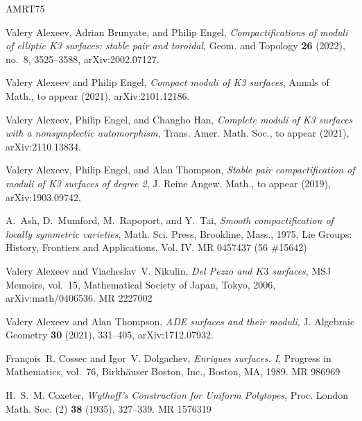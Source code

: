 \documentclass{amsart}
\begin{document}
\def\cprime{$'$}
\providecommand{\bysame}{\leavevmode\hbox to3em{\hrulefill}\thinspace}
\providecommand{\MR}{\relax\ifhmode\unskip\space\fi MR }
\providecommand{\MRhref}[2]{%
  \href{http://www.ams.org/mathscinet-getitem?mr=#1}{#2}
}
\providecommand{\href}[2]{#2}
\begin{thebibliography}{AMRT75}

Valery Alexeev, Adrian Brunyate, and Philip Engel, \emph{Compactifications of
  moduli of elliptic {K3} surfaces: stable pair and toroidal}, Geom. and
  Topology \textbf{26} (2022), no.~8, 3525--3588, arXiv:2002.07127.

Valery Alexeev and Philip Engel, \emph{Compact moduli of {K}3 surfaces}, Annals
  of Math., to appear (2021), arXiv:2101.12186.

Valery Alexeev, Philip Engel, and Changho Han, \emph{Complete moduli of {K}3
  surfaces with a nonsymplectic automorphism}, Trans. Amer. Math. Soc., to
  appear (2021), arXiv:2110.13834.

Valery Alexeev, Philip Engel, and Alan Thompson, \emph{Stable pair
  compactification of moduli of {K3} surfaces of degree 2}, J. Reine Angew.
  Math., to appear (2019), arXiv:1903.09742.

A.~Ash, D.~Mumford, M.~Rapoport, and Y.~Tai, \emph{Smooth compactification of
  locally symmetric varieties}, Math. Sci. Press, Brookline, Mass., 1975, Lie
  Groups: History, Frontiers and Applications, Vol. IV. \MR{0457437 (56
  \#15642)}

Valery Alexeev and Viacheslav~V. Nikulin, \emph{Del {P}ezzo and {$K3$}
  surfaces}, MSJ Memoirs, vol.~15, Mathematical Society of Japan, Tokyo, 2006,
  arXiv:math/0406536. \MR{2227002}

Valery Alexeev and Alan Thompson, \emph{{ADE} surfaces and their moduli}, J.
  Algebraic Geometry \textbf{30} (2021), 331--405, arXiv:1712.07932.

Fran\c{c}ois~R. Cossec and Igor~V. Dolgachev, \emph{Enriques surfaces. {I}},
  Progress in Mathematics, vol.~76, Birkh\"{a}user Boston, Inc., Boston, MA,
  1989. \MR{986969}

H.~S.~M. Coxeter, \emph{Wythoff's {C}onstruction for {U}niform {P}olytopes},
  Proc. London Math. Soc. (2) \textbf{38} (1935), 327--339. \MR{1576319}


\end{thebibliography}
\end{document}
